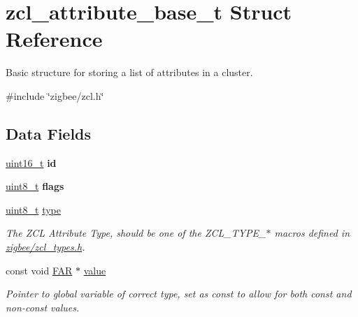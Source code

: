 \hypertarget{structzcl__attribute__base__t}{\section{zcl\-\_\-attribute\-\_\-base\-\_\-t Struct Reference}
\label{structzcl__attribute__base__t}
}


Basic structure for storing a list of attributes in a cluster.  




{\ttfamily \#include \char`\"{}zigbee/zcl.\-h\char`\"{}}

\subsection*{Data Fields}
\begin{DoxyCompactItemize}
\item 
\hypertarget{group__zcl_ga4fc3a0c58dfbd1e68224521185cb9384}{\hyperlink{group__hal_ga5a8b2dc9e45a9ee81a94ef304fb62505}{uint16\-\_\-t} {\bfseries id}}\label{group__zcl_ga4fc3a0c58dfbd1e68224521185cb9384}

\item 
\hypertarget{group__zcl_gaa2585d779da0ab21273a8d92de9a0ebe}{\hyperlink{group__hal_gae1affc9ca37cfb624959c866a73f83c2}{uint8\-\_\-t} {\bfseries flags}}\label{group__zcl_gaa2585d779da0ab21273a8d92de9a0ebe}

\item 
\hypertarget{group__zcl_ga1d127017fb298b889f4ba24752d08b8e}{\hyperlink{group__hal_gae1affc9ca37cfb624959c866a73f83c2}{uint8\-\_\-t} \hyperlink{group__zcl_ga1d127017fb298b889f4ba24752d08b8e}{type}}\label{group__zcl_ga1d127017fb298b889f4ba24752d08b8e}

\begin{DoxyCompactList}\small\item\em The Z\-C\-L Attribute Type, should be one of the Z\-C\-L\-\_\-\-T\-Y\-P\-E\-\_\-$\ast$ macros defined in \hyperlink{zcl__types_8h}{zigbee/zcl\-\_\-types.\-h}. \end{DoxyCompactList}\item 
const void \hyperlink{group__hal_gaef060b3456fdcc093a7210a762d5f2ed}{F\-A\-R} $\ast$ \hyperlink{group__zcl_gaaaa0b89997c57cfca2dfae40f46e702d}{value}
\begin{DoxyCompactList}\small\item\em Pointer to global variable of correct type, set as {\ttfamily const} to allow for both const and non-\/const values. \end{DoxyCompactList}\end{DoxyCompactItemize}


